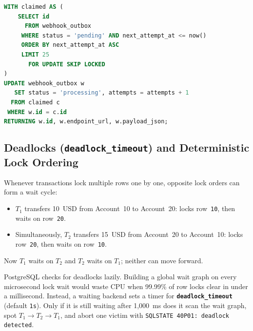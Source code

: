 \begin{lstlisting}[language=SQL]
WITH claimed AS (
    SELECT id
      FROM webhook_outbox
     WHERE status = 'pending' AND next_attempt_at <= now()
     ORDER BY next_attempt_at ASC
     LIMIT 25
       FOR UPDATE SKIP LOCKED
)
UPDATE webhook_outbox w
   SET status = 'processing', attempts = attempts + 1
  FROM claimed c
 WHERE w.id = c.id
RETURNING w.id, w.endpoint_url, w.payload_json;
\end{lstlisting}

\subsection{Deadlocks (\texttt{deadlock\_timeout}) and Deterministic Lock Ordering}

Whenever transactions lock multiple rows one by one, opposite lock orders can form a wait cycle:
\begin{itemize}
  \item $T_1$ transfers 10~USD from Account~10 to Account~20: locks row~\texttt{10}, then waits on row~\texttt{20}.
  \item Simultaneously, $T_2$ transfers 15~USD from Account~20 to Account~10: locks row~\texttt{20}, then waits on row~\texttt{10}.
\end{itemize}
Now $T_1$ waits on $T_2$ and $T_2$ waits on $T_1$; neither can move forward.

PostgreSQL checks for deadlocks lazily. Building a global wait graph on every microsecond lock wait would waste CPU when 99.99\% of row locks clear in under a millisecond. Instead, a waiting backend sets a timer for \textbf{\texttt{deadlock\_timeout}} (default \texttt{1s}). Only if it is still waiting after 1,000~ms does it scan the wait graph, spot $T_1 \to T_2 \to T_1$, and abort one victim with \texttt{SQLSTATE 40P01: deadlock detected}.


